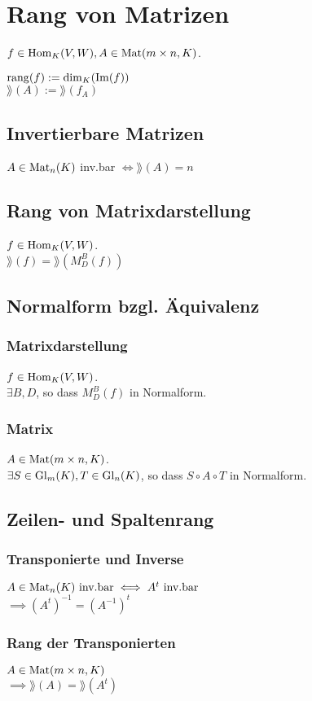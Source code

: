 \section*{Rang von Matrizen}

$f \in \operatorname{Hom}_K(V,W), A\in\operatorname{Mat}(m \times n, K)$.

$\operatorname{rang}(f) := \dim_K(\operatorname{Im}(f))$ \\
$\rang(A) := \rang(f_A)$

\subsection*{Invertierbare Matrizen}
$A \in\operatorname{Mat}_n(K)$ inv.bar $\iff \rang(A) = n$

\subsection*{Rang von Matrixdarstellung}
$f\in\operatorname{Hom}_K(V,W)$. \\
$\rang(f) = \rang(M_D^B(f))$

\subsection*{Normalform bzgl. Äquivalenz}

\subsubsection*{Matrixdarstellung}
$f \in\operatorname{Hom}_K(V,W)$. \\
$\exists B,D$, so dass $M_D^B(f)$ in Normalform.

\subsubsection*{Matrix}
$A\in\operatorname{Mat}(m \times n, K)$. \\
$\exists S \in \operatorname{Gl}_m(K), T\in\operatorname{Gl}_n(K)$, so dass
$S \circ A \circ T$ in Normalform.

\subsection*{Zeilen- und Spaltenrang}
\subsubsection*{Transponierte und Inverse}
$A\in\operatorname{Mat}_n(K) \text{ inv.bar} \iff A^t \text{ inv.bar}$ \\
$\implies (A^t)^{-1} = (A^{-1})^t$

\subsubsection*{Rang der Transponierten}
$A\in\operatorname{Mat}(m \times n, K)$ \\
$\implies \rang(A) = \rang(A^t)$
